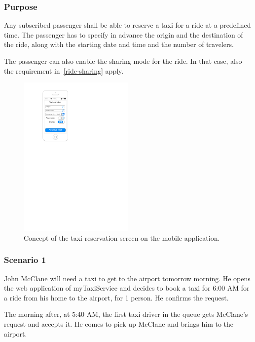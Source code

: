 \label{taxi-reservation}
\subsubsection{Purpose}

Any subscribed passenger shall be able to reserve a taxi for a ride at a predefined time. The passenger has to specify in advance the origin and the destination of the ride, along with the starting date and time and the number of travelers.

The passenger can also enable the sharing mode for the ride.
In that case, also the requirement in~\autoref{ride-sharing} apply.

\begin{figure}
	\begin{center}
	\includegraphics[width=0.5\textwidth]{mockup/TaxiReservation.pdf}
	\caption{Concept of the taxi reservation screen on the mobile application.}
	\label{fig:mockup-reservation}
	\end{center}
\end{figure}

\subsubsection{Scenario 1}
John McClane will need a taxi to get to the airport tomorrow morning. He opens the web application of myTaxiService and decides to book a taxi for 6:00 AM for a ride from his home to the airport, for 1 person. He confirms the request.

The morning after, at 5:40 AM, the first taxi driver in the queue gets McClane's request and accepts it. He comes to pick up McClane and brings him to the airport.

